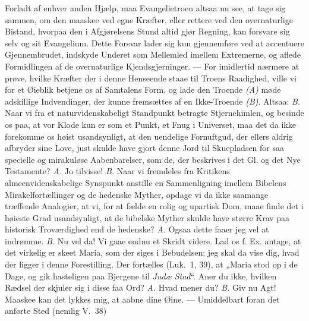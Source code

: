 \documentclass[12pt,a4paper]{book}
\begin{document}
Forladt af enhver anden Hjælp, maa Evangelietroen altsaa nu see, at tage sig
sammen, om den maaskee ved egne Kræfter, eller rettere ved den overnaturlige
Bistand, hvorpaa den i Afgjørelsens Stund altid gjør Regning, kan forsvare sig
selv og sit Evangelium. Dette Forsvar lader sig kun gjennemføre ved at
accentuere Gjennembrudet, indskyde Underet som Mellemled imellem Extremerne, og
aflede Formidlingen af de overnaturlige Kjendsgjerninger. --- For imidlertid
nærmere at prøve, hvilke Kræfter der i denne Henseende staae til Troens
Raadighed, ville vi for et Øieblik betjene os af Samtalens Form, og lade den
Troende \textit{(A)} møde adskillige Indvendinger, der kunne fremsættes af en
Ikke-Troende \textit{(B)}. Altsaa: \textit{B.} Naar vi fra et
naturvidenskabeligt Standpunkt betragte Stjernehimlen, og besinde os paa, at vor
Klode kun er som et Punkt, et Fnug i Universet, maa det da
ikke forekomme os høist usandsynligt, at den uendelige Fornuftgud, der ellers
aldrig afbryder sine Love, just skulde have gjort denne Jord til Skuepladsen for
saa specielle og mirakuløse Aabenbarelser, som de, der beskrives i det Gl. og
det Nye Testamente? \textit{A.} Jo tilvisse! \textit{B.} Naar vi fremdeles fra
Kritikens almeenvidenskabelige Synspunkt anstille en Sammenligning imellem
Bibelens Mirakelfortællinger og de hedenske Myther, opdage vi da ikke saamange
træffende Analogier, at vi, for at fælde en rolig og upartisk Dom, maae finde
det i høieste Grad usandsynligt, at de bibelske Myther skulde have større Krav
paa historisk Troværdighed end de hedenske? \textit{A.} Ogsaa dette faaer jeg
vel at indrømme. \textit{B.} Nu vel da! Vi gaae endnu et Skridt videre. Lad os
f. Ex. antage, at det virkelig er skeet Maria, som der siges i Bebudelsen; jeg
skal da vise dig, hvad der ligger i denne Forestilling. Der fortælles (Luk.\ 1,
39), at „Maria stod op i de Dage, og gik hasteligen paa Bjergene til \emph{Judæ
Stad}“. Aner du ikke, hvilken Rædsel der skjuler sig i disse faa Ord?
\textit{A.} Hvad mener du? \textit{B.} Giv nu Agt! Maaskee kan det lykkes mig,
at aabne dine Øine. --- Umiddelbart foran det anførte Sted (nemlig V.\ 38)
\end{document}
